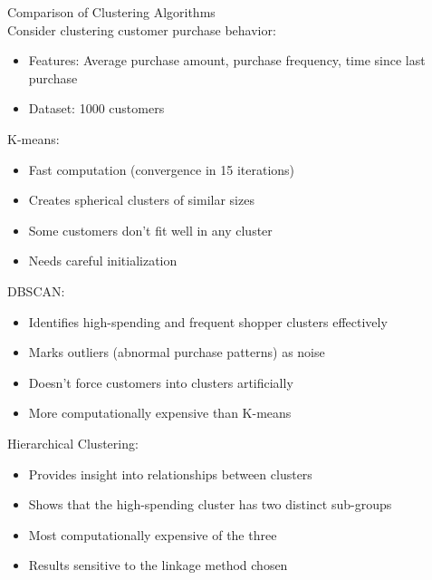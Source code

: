 \begin{example2}{Comparison of Clustering Algorithms}\\
Consider clustering customer purchase behavior:
\begin{itemize}
    \item Features: Average purchase amount, purchase frequency, time since last purchase
    \item Dataset: 1000 customers
\end{itemize}
\tcblower
K-means:
\begin{itemize}
    \item Fast computation (convergence in 15 iterations)
    \item Creates spherical clusters of similar sizes
    \item Some customers don't fit well in any cluster
    \item Needs careful initialization
\end{itemize}

DBSCAN:
\begin{itemize}
    \item Identifies high-spending and frequent shopper clusters effectively
    \item Marks outliers (abnormal purchase patterns) as noise
    \item Doesn't force customers into clusters artificially
    \item More computationally expensive than K-means
\end{itemize}

Hierarchical Clustering:
\begin{itemize}
    \item Provides insight into relationships between clusters
    \item Shows that the high-spending cluster has two distinct sub-groups
    \item Most computationally expensive of the three
    \item Results sensitive to the linkage method chosen
\end{itemize}
\end{example2}


